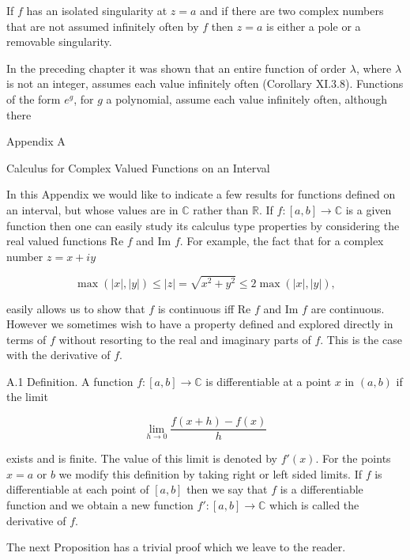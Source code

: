 If $f$ has an isolated singularity at $z = a$ and if there are two complex numbers that are not assumed infinitely often by $f$ then $z = a$ is either a pole or a removable singularity.

In the preceding chapter it was shown that an entire function of order $\lambda$, where $\lambda$ is not an integer, assumes each value infinitely often (Corollary XI.3.8). Functions of the form $e^g$, for $g$ a polynomial, assume each value infinitely often, although there

Appendix A

Calculus for Complex Valued Functions on an Interval

In this Appendix we would like to indicate a few results for functions defined on an interval, but whose values are in $\mathbb{C}$ rather than $\mathbb{R}$. If $f: [a, b] \to \mathbb{C}$ is a given function then one can easily study its calculus type properties by considering the real valued functions $\text{Re } f$ and $\text{Im } f$. For example, the fact that for a complex number $z = x + iy$

$$\max(|x|, |y|) \leq |z| = \sqrt{x^2 + y^2} \leq 2 \max(|x|, |y|),$$

easily allows us to show that $f$ is continuous iff $\text{Re } f$ and $\text{Im } f$ are continuous. However we sometimes wish to have a property defined and explored directly in terms of $f$ without resorting to the real and imaginary parts of $f$. This is the case with the derivative of $f$.

A.1 Definition. A function $f: [a, b] \to \mathbb{C}$ is differentiable at a point $x$ in $(a, b)$ if the limit

$$\lim_{h \to 0} \frac{f(x+h) - f(x)}{h}$$

exists and is finite. The value of this limit is denoted by $f'(x)$. For the points $x = a$ or $b$ we modify this definition by taking right or left sided limits. If $f$ is differentiable at each point of $[a, b]$ then we say that $f$ is a differentiable function and we obtain a new function $f': [a, b] \to \mathbb{C}$ which is called the derivative of $f$.

The next Proposition has a trivial proof which we leave to the reader.